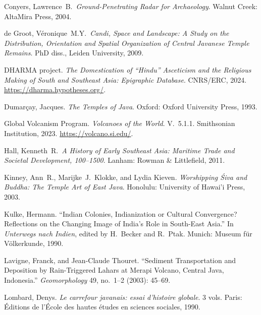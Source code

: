 \documentclass[12pt,a4paper]{article}
\begin{document}
\vspace{0.5em}
\noindent Conyers, Lawrence~B.\ \emph{Ground-Penetrating Radar for Archaeology}. Walnut Creek: AltaMira Press, 2004.

\vspace{0.5em}
\noindent de Groot, V\'{e}ronique~M.Y.\ \emph{Candi, Space and Landscape: A Study on the Distribution, Orientation and Spatial Organization of Central Javanese Temple Remains}. PhD diss., Leiden University, 2009.

\vspace{0.5em}
\noindent DHARMA project. \emph{The Domestication of ``Hindu'' Asceticism and the Religious Making of South and Southeast Asia: Epigraphic Database}. CNRS/ERC, 2024. \url{https://dharma.hypotheses.org/}.

\vspace{0.5em}
\noindent Dumar\c{c}ay, Jacques. \emph{The Temples of Java}. Oxford: Oxford University Press, 1993.

\vspace{0.5em}
\noindent Global Volcanism Program. \emph{Volcanoes of the World}. V.~5.1.1. Smithsonian Institution, 2023. \url{https://volcano.si.edu/}.

\vspace{0.5em}
\noindent Hall, Kenneth~R.\ \emph{A History of Early Southeast Asia: Maritime Trade and Societal Development, 100--1500}. Lanham: Rowman \& Littlefield, 2011.

\vspace{0.5em}
\noindent Kinney, Ann~R., Marijke~J.\ Klokke, and Lydia Kieven. \emph{Worshipping \'{S}iva and Buddha: The Temple Art of East Java}. Honolulu: University of Hawai'i Press, 2003.

\vspace{0.5em}
\noindent Kulke, Hermann. ``Indian Colonies, Indianization or Cultural Convergence? Reflections on the Changing Image of India's Role in South-East Asia.'' In \emph{Unterwegs nach Indien}, edited by H.\ Becker and R.\ Ptak. Munich: Museum f\"{u}r V\"{o}lkerkunde, 1990.

\vspace{0.5em}
\noindent Lavigne, Franck, and Jean-Claude Thouret. ``Sediment Transportation and Deposition by Rain-Triggered Lahars at Merapi Volcano, Central Java, Indonesia.'' \emph{Geomorphology} 49, no.~1--2 (2003): 45--69.

\vspace{0.5em}
\noindent Lombard, Denys. \emph{Le carrefour javanais: essai d'histoire globale}. 3 vols. Paris: \'{E}ditions de l'\'{E}cole des hautes \'{e}tudes en sciences sociales, 1990.
\end{document}
